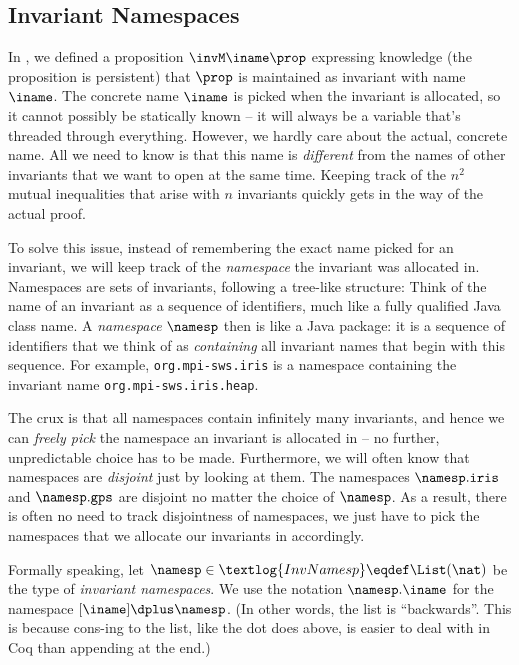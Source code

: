 \subsection{Invariant Namespaces}
\label{sec:namespaces}

In , we defined a proposition $\invM\iname\prop$ expressing knowledge (\ie the proposition is persistent) that $\prop$ is maintained as invariant with name $\iname$.
The concrete name $\iname$ is picked when the invariant is allocated, so it cannot possibly be statically known -- it will always be a variable that's threaded through everything.
However, we hardly care about the actual, concrete name.
All we need to know is that this name is \emph{different} from the names of other invariants that we want to open at the same time.
Keeping track of the $n^2$ mutual inequalities that arise with $n$ invariants quickly gets in the way of the actual proof.

To solve this issue, instead of remembering the exact name picked for an invariant, we will keep track of the \emph{namespace} the invariant was allocated in.
Namespaces are sets of invariants, following a tree-like structure:
Think of the name of an invariant as a sequence of identifiers, much like a fully qualified Java class name.
A \emph{namespace} $\namesp$ then is like a Java package: it is a sequence of identifiers that we think of as \emph{containing} all invariant names that begin with this sequence. For example, \texttt{org.mpi-sws.iris} is a namespace containing the invariant name \texttt{org.mpi-sws.iris.heap}.

The crux is that all namespaces contain infinitely many invariants, and hence we can \emph{freely pick} the namespace an invariant is allocated in -- no further, unpredictable choice has to be made.
Furthermore, we will often know that namespaces are \emph{disjoint} just by looking at them.
The namespaces $\namesp.\texttt{iris}$ and $\namesp.\texttt{gps}$ are disjoint no matter the choice of $\namesp$.
As a result, there is often no need to track disjointness of namespaces, we just have to pick the namespaces that we allocate our invariants in accordingly.

Formally speaking, let $\namesp \in \textlog{InvNamesp} \eqdef \List(\nat)$ be the type of \emph{invariant namespaces}.
We use the notation $\namesp.\iname$ for the namespace $[\iname] \dplus \namesp$.
(In other words, the list is ``backwards''. This is because cons-ing to the list, like the dot does above, is easier to deal with in Coq than appending at the end.)


